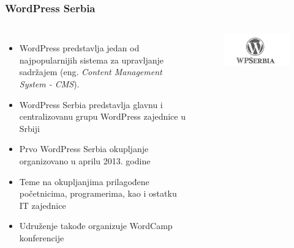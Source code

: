 \documentclass[hyperref={bookmarks=false},aspectratio=169]{beamer}
\begin{document}
\begin{frame}
\frametitle{WordPress Serbia}

\begin{columns}[T]

\begin{itemize}
    \item WordPress predstavlja jedan od najpopularnijih sistema za upravljanje sadržajem (eng. \emph{Content Management System - CMS}).
    \item WordPress Serbia predstavlja glavnu i centralizovanu grupu WordPress zajednice u Srbiji
    \item Prvo WordPress Serbia okupljanje organizovano u aprilu 2013. godine
    \item Teme na okupljanjima prilagođene početnicima, programerima, kao i ostatku IT zajednice
    \item Udruženje takođe organizuje WordCamp konferencije
\end{itemize}



\begin{figure}
    \raggedleft
    \includegraphics[scale=0.4]{./images/wp.jpg}
\end{figure}

\end{columns}
\end{frame}
\end{document}
